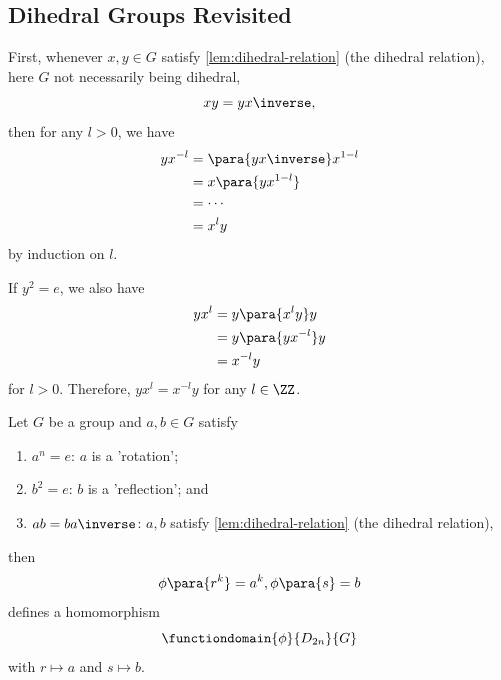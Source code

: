 \subsection{Dihedral Groups Revisited}
\label{sec:dihedral-group-revisited}
\begin{remark}
    First, whenever \(x, y \in G\) satisfy \autoref{lem:dihedral-relation} (the dihedral relation), here \(G\) not necessarily being dihedral,
    \[
        xy = y x\inverse,
    \]
    then for any \(l > 0\), we have
    \begin{align*}
        y x^{-l} &= \para{y x \inverse} x^{1 - l} \\
        &= x \para{y x^{1 - l}} \\
        &= \cdots\\
        &= x^l y
    \end{align*}
    by induction on \(l\).

    If \(y^2 = e\), we also have
    \begin{align*}
        y x^l &= y \para{x^l y} y \\
        &= y \para{y x^{-l}} y \\
        &= x^{-l} y
    \end{align*}
    for \(l > 0\). Therefore, \(y x^l = x^{-l} y\) for any \(l \in \ZZ\).
\end{remark}

\begin{lemma}
    \label{lem:homomorphism-dihedral-group}
    Let \(G\) be a group and \(a, b \in G\) satisfy
    \begin{enumerate}
        \item \(a^n = e\): \(a\) is a 'rotation';
        \item \(b^2 = e\): \(b\) is a 'reflection'; and
        \item \(ab = b a\inverse\): \(a, b\) satisfy \autoref{lem:dihedral-relation} (the dihedral relation),
    \end{enumerate}
    then
    \[
    \phi \para{r^k} = a^k, \phi \para{s} = b
    \]
    defines a homomorphism
    \[
        \functiondomain{\phi}{D_{2n}}{G}
    \]
    with \(r \mapsto a\) and \(s \mapsto b\).
\end{lemma}

